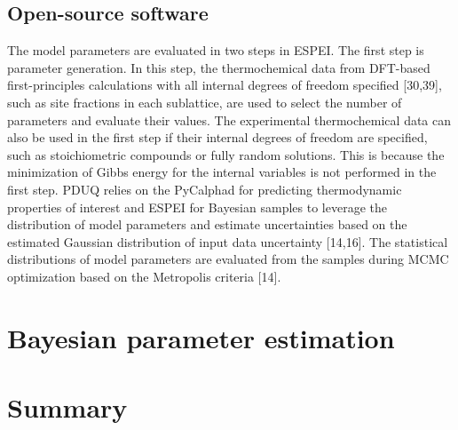 \subsection{Open-source software} \label{method:ssec:tools}
The model parameters are evaluated in two steps in ESPEI. The first step is parameter generation. In this step, the thermochemical data from DFT-based first-principles calculations with all internal degrees of freedom specified [30,39], such as site fractions in each sublattice, are used to select the number of parameters and evaluate their values. The experimental thermochemical data can also be used in the first step if their internal degrees of freedom are specified, such as stoichiometric compounds or fully random solutions. This is because the minimization of Gibbs energy for the internal variables is not performed in the first step. PDUQ relies on the PyCalphad for predicting thermodynamic properties of interest and ESPEI for Bayesian samples to leverage the distribution of model parameters and estimate uncertainties based on the estimated Gaussian distribution of input data uncertainty [14,16]. The statistical distributions of model parameters are evaluated from the samples during MCMC optimization based on the Metropolis criteria [14].


\section{Bayesian parameter estimation} \label{method:ssec:Bayesian}

\section{Summary} \label{method:ssec:summary}

